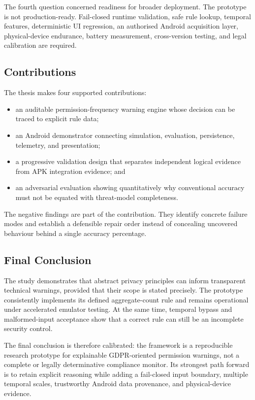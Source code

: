 The fourth question concerned readiness for broader deployment. The prototype is not production-ready. Fail-closed runtime validation, safe rule lookup, temporal features, deterministic UI regression, an authorised Android acquisition layer, physical-device endurance, battery measurement, cross-version testing, and legal calibration are required.

\subsection{Contributions}

The thesis makes four supported contributions:

\begin{itemize}
    \item an auditable permission-frequency warning engine whose decision can be traced to explicit rule data;
    \item an Android demonstrator connecting simulation, evaluation, persistence, telemetry, and presentation;
    \item a progressive validation design that separates independent logical evidence from APK integration evidence; and
    \item an adversarial evaluation showing quantitatively why conventional accuracy must not be equated with threat-model completeness.
\end{itemize}

The negative findings are part of the contribution. They identify concrete failure modes and establish a defensible repair order instead of concealing uncovered behaviour behind a single accuracy percentage.

\subsection{Final Conclusion}

The study demonstrates that abstract privacy principles can inform transparent technical warnings, provided that their scope is stated precisely. The prototype consistently implements its defined aggregate-count rule and remains operational under accelerated emulator testing. At the same time, temporal bypass and malformed-input acceptance show that a correct rule can still be an incomplete security control.

The final conclusion is therefore calibrated: the framework is a reproducible research prototype for explainable GDPR-oriented permission warnings, not a complete or legally determinative compliance monitor. Its strongest path forward is to retain explicit reasoning while adding a fail-closed input boundary, multiple temporal scales, trustworthy Android data provenance, and physical-device evidence.
